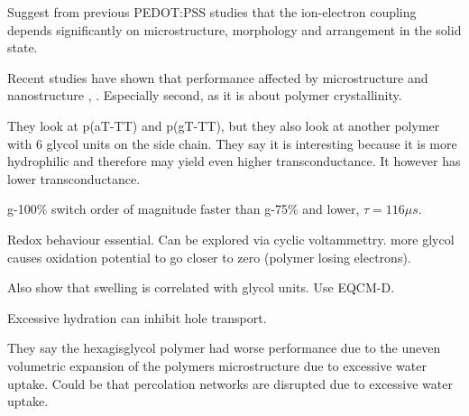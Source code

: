 \documentclass{article}
\begin{document}
Suggest from previous PEDOT:PSS studies that the ion-electron coupling depends significantly on microstructure, morphology and arrangement in the solid state. 

Recent studies have shown that performance affected by microstructure and nanostructure \cite{Savva2020}, \cite{Flagg2019}.  Especially second, as it is about polymer crystallinity.  

They look at p(aT-TT) and p(gT-TT), but they also look at another polymer with 6 glycol units on the side chain.  They say it is interesting because it is more hydrophilic and therefore may yield even higher transconductance.   It however has lower transconductance. 

g-100\% switch order of magnitude faster than g-75\% and lower, $\tau = 116 \mu s$.  

Redox behaviour essential.  Can be explored via cyclic voltammettry. more glycol causes oxidation potential to go closer to zero (polymer losing electrons).  

Also show that swelling is correlated with glycol units.  Use EQCM-D.   

Excessive hydration can inhibit hole transport.  

They say the hexagisglycol polymer had worse performance due to the uneven volumetric expansion of the polymers microstructure due to excessive water uptake. Could be that percolation networks are disrupted due to excessive water uptake.   


















\newpage

\footnotesize

  
\end{document}
